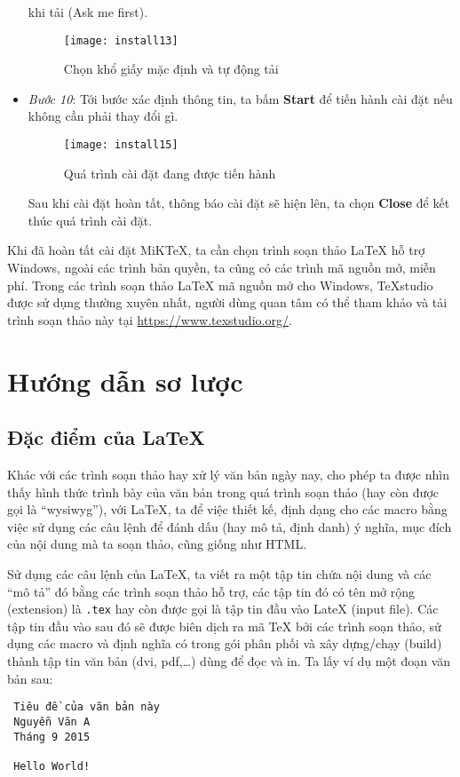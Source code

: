 \begin{itemize}
  khi tải (Ask me first).
  \begin{figure}[H]
  \centering
  \texttt{[image: install13]}
  \caption{Chọn khổ giấy mặc định và tự động tải}
  \label{fig:prefer}
  \end{figure}
  \item \textsl{Bước 10}: Tới bước xác định thông tin, ta bấm \textbf{Start} để tiến hành cài đặt
  nếu không cần phải thay đổi gì.
  \begin{figure}[H]
  \centering
  \texttt{[image: install15]}
  \caption{Quá trình cài đặt đang được tiến hành}
  \label{fig:installing}
  \end{figure}
  Sau khi cài đặt hoàn tất, thông báo cài đặt sẽ hiện lên, ta chọn \textbf{Close} để kết thúc quá trình
  cài đặt.
\end{itemize}

Khi đã hoàn tất cài đặt MiKTeX, ta cần chọn trình soạn thảo LaTeX hỗ trợ Windows, ngoài các trình
bản quyền, ta cũng có các trình mã nguồn mở, miễn phí. Trong các trình soạn thảo LaTeX mã nguồn mở cho Windows,
TeXstudio được sử dụng thường xuyên nhất, người dùng quan tâm có thể tham khảo và tải trình soạn thảo này tại
\url{https://www.texstudio.org/}.\par 

\section{Hướng dẫn sơ lược}\label{sec:2.2}
\subsection{Đặc điểm của \LaTeX}\label{subsec:2.2.1}
Khác với các trình soạn thảo hay xử lý văn bản ngày nay, cho phép ta được nhìn thấy hình thức trình
bày của văn bản trong quá trình soạn thảo (hay còn được gọi là “\acrshort{wysiwyg}”), với LaTeX, ta 
để việc thiết kế, định dạng cho các macro bằng việc sử dụng các câu lệnh để đánh dấu (hay mô tả, định danh) 
ý nghĩa, mục đích của nội dung mà ta soạn thảo, cũng giống như HTML.\par 
Sử dụng các câu lệnh của LaTeX, ta viết ra một tập tin chứa nội dung và các “mô tả” đó bằng các trình soạn thảo 
hỗ trợ, các tập tin đó có tên mở rộng (extension) là \verb|.tex| hay còn được gọi là tập tin đầu vào LateX 
(input file). Các tập tin đầu vào sau đó sẽ được biên dịch ra mã TeX bởi các trình soạn thảo, sử dụng các macro và 
định nghĩa có trong gói phân phối và xây dựng/chạy (build) thành tập tin văn bản (dvi, pdf,\dots) 
dùng để đọc và in. Ta lấy ví dụ một đoạn văn bản sau:\par 
\begin{verbatim}
 Tiêu đề của văn bản này
 Nguyễn Văn A
 Tháng 9 2015
 
 Hello World!
\end{verbatim}

